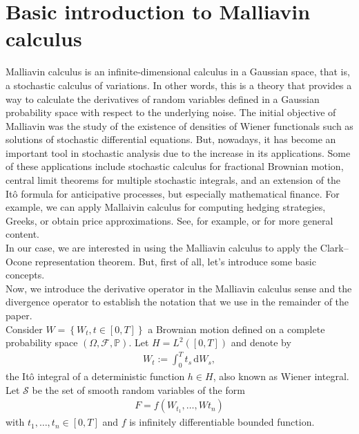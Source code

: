 \documentclass[a4paper,10pt]{article}
\renewcommand{\d}{\,\mathrm{d}}
\newcommand{\1}{\mathbf{1}}
\begin{document}
\section{Basic introduction to Malliavin calculus}\label{sec:Malliavin}
Malliavin calculus is an infinite-dimensional calculus in a Gaussian space, that is, a stochastic calculus of variations. In other words, this is a theory that provides a way to calculate the derivatives of random variables defined in a Gaussian probability space with respect to the underlying noise. The initial objective of Malliavin was the study of the existence of densities of Wiener functionals such as solutions of stochastic differential equations. But, nowadays, it has become an important tool in stochastic analysis due to the increase in its applications. Some of these applications include stochastic calculus for fractional Brownian motion, central limit theorems for multiple stochastic integrals, and an extension of the Itô formula for anticipative processes, but especially mathematical finance. For example, we can apply Mallaivin calculus for computing hedging strategies, Greeks, or obtain price approximations. See, for example, \cite{AlosLorite} or \cite{Nualart} for more general content.\\

In our case, we are interested in using the Malliavin calculus to apply the Clark–Ocone representation theorem. But, first of all, let's introduce some basic concepts.\\ 

Now, we introduce the derivative operator in the Malliavin calculus sense and the divergence operator to establish the notation that we use in the remainder of the paper.\\

Consider $W=\left\{W_{t}, t\in \left[0,T\right]\right\}$ a Brownian motion defined on a complete probability space $\left(\Omega, \mathcal{F}, \mathbb{P}\right)$. Let $H=L^{2}(\left[0,T\right])$ and denote by 
\begin{eqnarray*}
W_{t} := \int^{T}_{0} t_{s} \d W_{s},
\end{eqnarray*}
the It\^o integral of a deterministic function $h \in H$, also known as Wiener integral. Let $\mathcal{S}$ be the set of smooth random variables of the form
\begin{eqnarray*}
F=f\left(W_{t_{1}}, \ldots, W{t_{n}}\right)
\end{eqnarray*}
with $t_{1}, \ldots, t_{n} \in \left[0,T\right]$ and $f$ is infinitely differentiable bounded function.
\end{document}
